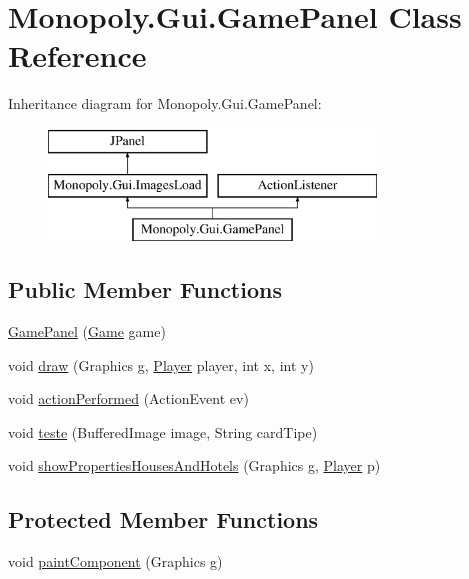 \hypertarget{class_monopoly_1_1_gui_1_1_game_panel}{}\section{Monopoly.\+Gui.\+Game\+Panel Class Reference}
\label{class_monopoly_1_1_gui_1_1_game_panel}
Inheritance diagram for Monopoly.\+Gui.\+Game\+Panel\+:\begin{figure}[H]
\begin{center}
\leavevmode
\includegraphics[height=3.000000cm]{class_monopoly_1_1_gui_1_1_game_panel}
\end{center}
\end{figure}
\subsection*{Public Member Functions}
\begin{DoxyCompactItemize}
\item 
\hyperlink{class_monopoly_1_1_gui_1_1_game_panel_a5d29924ab30b719b403453d61d5591b6}{Game\+Panel} (\hyperlink{class_monopoly_1_1_logic_1_1_game}{Game} game)
\item 
void \hyperlink{class_monopoly_1_1_gui_1_1_game_panel_aa8b1c7dfb466fd5a282b259a8dc915bc}{draw} (Graphics g, \hyperlink{class_monopoly_1_1_logic_1_1_player}{Player} player, int x, int y)
\item 
void \hyperlink{class_monopoly_1_1_gui_1_1_game_panel_a8f402ea9ba3f0a8aff2b5d313d223e7f}{action\+Performed} (Action\+Event ev)
\item 
void \hyperlink{class_monopoly_1_1_gui_1_1_game_panel_ae13e10a310bc5804f3142bffc612aa92}{teste} (Buffered\+Image image, String card\+Tipe)
\item 
void \hyperlink{class_monopoly_1_1_gui_1_1_game_panel_ab541c5881bf46e62861710187cdd6440}{show\+Properties\+Houses\+And\+Hotels} (Graphics g, \hyperlink{class_monopoly_1_1_logic_1_1_player}{Player} p)
\end{DoxyCompactItemize}
\subsection*{Protected Member Functions}
\begin{DoxyCompactItemize}
\item 
void \hyperlink{class_monopoly_1_1_gui_1_1_game_panel_a9c5ce2fd23969e5c3ab66a00368c4cfe}{paint\+Component} (Graphics g)
\end{DoxyCompactItemize}
